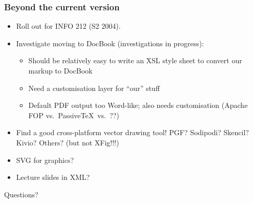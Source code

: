 \documentclass[pdftex]{beamer}
\begin{document}
\frame
{
	\frametitle{Beyond the current version}
	
	\begin{itemize}
	
		\item Roll out for INFO 212 (S2 2004).
		
		\item Investigate moving to DocBook (investigations in
		progress):
		
		\begin{itemize}
		
			\item Should be relatively easy to write an XSL style sheet
			to convert our markup to DocBook
			
			\item Need a customisation layer for ``our'' stuff
			
			\item Default PDF output too Word-like; also needs
			customisation (Apache FOP vs.\ Passive\TeX\ vs.\ ??)
			
		\end{itemize}
		
		\item Find a good cross-platform vector drawing tool! PGF?
		Sodipodi? Skencil? Kivio? Others? (but \alert{not} XFig!!!)
		
		\item SVG for graphics?
		
		\item Lecture slides in XML?
		
	
	\end{itemize}
}


\frame
{
	\centering\Huge{\alert{Questions?}}
}
\end{document}

